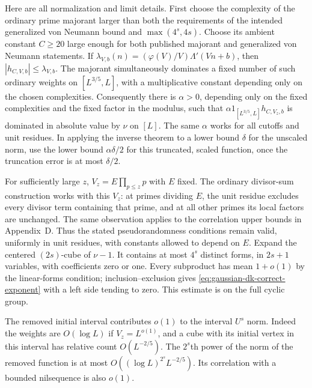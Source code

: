 \documentclass[11pt]{article}
\theoremstyle{definition}
\theoremstyle{remark}
\begin{document}
Here are all normalization and limit details. First choose the complexity
of the ordinary prime majorant larger than both the requirements of the
intended generalized von Neumann bound and
$\max(4^s,4s)$. Choose its ambient constant $C\geq20$ large enough for
both published majorant and generalized von Neumann statements. If
$\lambda_{V,b}(n)=(\varphi(V)/V)\Lambda'(Vn+b)$, then
$|h_{C,V,b}|\leq\lambda_{V,b}$. The majorant simultaneously dominates
a fixed number of such ordinary weights on $[L^{3/5},L]$, with a
multiplicative constant depending only on the chosen complexities.
Consequently there is $\alpha>0$, depending only on the fixed
complexities and the fixed factor in the modulus, such that
$\alpha 1_{[L^{3/5},L]}h_{C,V_z,b}$ is dominated in absolute value by
$\nu$ on $[L]$. The same $\alpha$ works for all cutoffs and unit residues.
In applying the inverse theorem to a lower bound $\delta$ for the
unscaled norm, use the lower bound $\alpha\delta/2$ for this truncated,
scaled function, once the truncation error is at most $\delta/2$.

For sufficiently large $z$, $V_z=E\prod_{p\leq z}p$ with $E$ fixed.
The ordinary divisor-sum construction works with this $V_z$: at primes
dividing $E$, the unit residue excludes every divisor term containing
that prime, and at all other primes its local factors are unchanged.
The same observation applies to the correlation upper bounds in
Appendix~D. Thus the stated pseudorandomness conditions remain valid,
uniformly in unit residues, with constants allowed to depend on $E$.
Expand the centered $(2s)$-cube of $\nu-1$. It contains at most $4^s$
distinct forms, in $2s+1$ variables, with coefficients zero or one.
Every subproduct has mean $1+o(1)$ by the linear-forms condition;
inclusion--exclusion gives \eqref{eq:gaussian-dk-correct-exponent} with
a left side tending to zero. This estimate is on the full cyclic group.

The removed initial interval contributes $o(1)$ to the interval $U^s$
norm. Indeed the weights are $O(\log L)$ if $V_z=L^{o(1)}$, and a cube
with its initial vertex in this interval has relative count
$O(L^{-2/5})$. The $2^s$th power of the norm of the removed function is
at most $O((\log L)^{2^s}L^{-2/5})$. Its correlation with a bounded
nilsequence is also $o(1)$.
\end{document}
